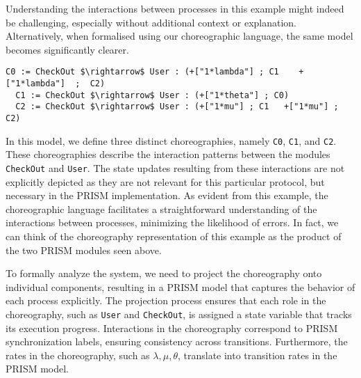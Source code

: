 Understanding the interactions between processes in this example might
indeed be challenging, especially without additional context or
explanation.  Alternatively, when formalised using our choreographic
language, the same model becomes significantly clearer.
\begin{lstlisting}[style=chor-color,% caption={Example of Listing \ref{example1} in our choreographic language},captionpos=b,
  frame=none, label={example2}]
  C0 := CheckOut $\rightarrow$ User : (+["1*lambda"] ; C1	 +["1*lambda"]  ;  C2)
  C1 := CheckOut $\rightarrow$ User : (+["1*theta"] ; C0)  
  C2 := CheckOut $\rightarrow$ User : (+["1*mu"] ; C1   +["1*mu"] ;  C2)
\end{lstlisting}
In this model, we define three distinct choreographies, namely
\texttt{C0}, \texttt{C1}, and \texttt{C2}. These choreographies
describe the interaction patterns between the modules \texttt{CheckOut}
and \texttt{User}. The state updates resulting from these
interactions are not explicitly depicted as they are not relevant for
this particular protocol, but necessary in the PRISM implementation.
%
%
As evident from this example, the choreographic language facilitates a
straightforward understanding of the interactions between processes,
minimizing the likelihood of errors. In fact, we can think of the
choreography representation of this example as the product of the two
PRISM modules seen above.


To formally analyze the system, we need to project the choreography onto individual components, resulting in a PRISM model that captures the behavior of each process explicitly. The projection process ensures that each role in the choreography, such as \texttt{User} and \texttt{CheckOut}, is assigned a state variable that tracks its execution progress. Interactions in the choreography correspond to PRISM synchronization labels, ensuring consistency across transitions. Furthermore, the rates in the choreography, such as $\lambda, \mu, \theta$, translate into transition rates in the PRISM model.

